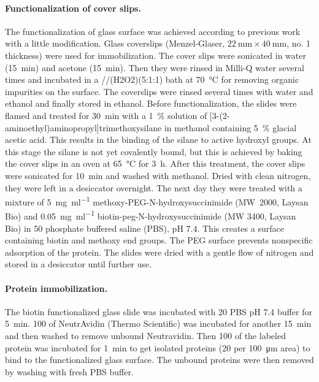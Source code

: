 \documentclass[journal=jacsat,manuscript=article]{achemso}
\begin{document}
\paragraph*{Functionalization of cover slips.}
The functionalization of glass surface was achieved according to previous work with a little modification.\cite{gupta2012involvement}
Glass coverslips (Menzel-Glaser, $\SI{22}{\mm} \times \SI{40}{\mm}$, no. 1 thickness) were used for immobilization.
The cover slips were sonicated in water (\SI{15}{\minute}) and acetone (\SI{15}{\minute}).
Then they were rinsed in Milli-Q water several times and incubated in a //\ce(H2O2)(5:1:1) bath at \SI{70}{\celsius} for removing organic impurities on the surface.
The coverslips were rinsed several times with water and ethanol and finally stored in ethanol.
Before functionalization, the slides were flamed and treated for \SI{30}{\minute} with a \SI{1}{\percent} solution of [3-(2-aminoethyl)aminopropyl]trimethoxysilane in methanol containing \SI{5}{\percent} glacial acetic acid. This results in the binding of the silane to active hydroxyl groups.
At this stage the silane is not yet covalently bound, but this is achieved by baking the cover slips in an oven at \SI{65}{\celsius} for \SI{3}{\hour}.
After this treatment, the cover slips were sonicated for \SI{10}{\minute} and washed with methanol.
Dried with clean nitrogen, they were left in a desiccator overnight. 
The next day they were treated with a mixture of \SI{5}{\mg\per\ml} methoxy-PEG-N-hydroxysuccinimide (MW~2000, Laysan Bio) and \SI{0.05}{\mg\per\ml} biotin-peg-N-hydroxysuccinimide (MW 3400, Laysan Bio) in \SI{50}{\mM} phosphate buffered saline (PBS), pH 7.4.
This creates a surface containing biotin and methoxy end groups.
The PEG surface prevents nonspecific adsorption of the protein.
The slides were dried with a gentle flow of nitrogen and stored in a desiccator until further use.

\paragraph*{Protein immobilization.}
The biotin functionalized glass slide was incubated with \SI{20}{\mM} PBS pH 7.4 buffer for \SI{5}{\minute}.
\SI{100}{\nM} of NeutrAvidin (Thermo Scientific) was incubated for another \SI{15}{\minute} and then washed to remove unbound Neutravidin. 
Then \SI{100}{\pM} of the labeled protein was incubated for \SI{1}{\minute} to get isolated proteins (20 per \SI{100}{\um} area) to bind to the functionalized glass surface.
The unbound proteins were then removed by washing with fresh PBS buffer.
\end{document}
